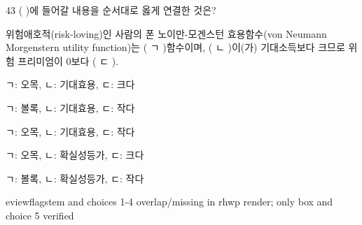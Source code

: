 \begin{question}{43}
( )에 들어갈 내용을 순서대로 옳게 연결한 것은?
\begin{framedtext}
위험애호적(risk-loving)인 사람의 폰 노이만-모겐스턴 효용함수(von Neumann Morgenstern utility function)는 ( ㄱ )함수이며, ( ㄴ )이(가) 기대소득보다 크므로 위험 프리미엄이 0보다 ( ㄷ ).
\end{framedtext}
\begin{choices}
  \item ㄱ: 오목, ㄴ: 기대효용, ㄷ: 크다
  \item ㄱ: 볼록, ㄴ: 기대효용, ㄷ: 작다
  \item ㄱ: 오목, ㄴ: 기대효용, ㄷ: 작다
  \item ㄱ: 오목, ㄴ: 확실성등가, ㄷ: 크다
  \item ㄱ: 볼록, ㄴ: 확실성등가, ㄷ: 작다
\end{choices}

eviewflag{stem and choices 1-4 overlap/missing in rhwp render; only box and choice 5 verified}
\end{question}
